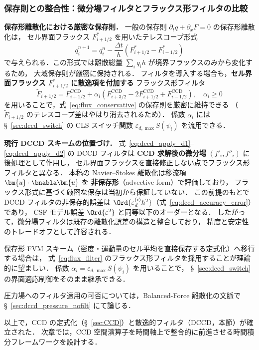 \subsubsection{保存則との整合性：微分場フィルタとフラックス形フィルタの比較}
\label{sec:dccd_conservation}

\textbf{保存形離散化における厳密な保存則．}
一般の保存則 $\partial_t q + \partial_x F = 0$ の保存形離散化は，
セル界面フラックス $F_{i+1/2}^*$ を用いたテレスコープ形式
\begin{equation}
  q_i^{n+1} = q_i^n - \frac{\Delta t}{h}\!\left(F_{i+1/2}^* - F_{i-1/2}^*\right)
  \label{eq:flux_conservative}
\end{equation}
で与えられる．この形式では離散総量 $\sum_i q_i h$ が境界フラックスのみから変化するため，
大域保存則が厳密に保持される．
フィルタを導入する場合も，\textbf{セル界面フラックス $F_{i+1/2}^*$ に散逸項を付加する}
フラックス形フィルタ
\begin{equation}
  \tilde{F}_{i+1/2} = F_{i+1/2}^{\mathrm{CCD}}
    + \alpha_i\!\left(F_{i+3/2}^{\mathrm{CCD}} - 2F_{i+1/2}^{\mathrm{CCD}} + F_{i-1/2}^{\mathrm{CCD}}\right),
  \quad \alpha_i \geq 0
  \label{eq:flux_filter}
\end{equation}
を用いることで，式~\eqref{eq:flux_conservative} の保存則を厳密に維持できる
（$\tilde{F}_{i+1/2}$ のテレスコープ差はやはり消去されるため）．
係数 $\alpha_i$ には §~\ref{sec:dccd_switch} の
CLS スイッチ関数 $\varepsilon_{d,\max} S(\psi_i)$ を流用できる．

\medskip
\noindent\textbf{現行 DCCD スキームの位置づけ．}
式~\eqref{eq:dccd_apply_d1}--\eqref{eq:dccd_apply_d2} の DCCD フィルタは
\textbf{CCD 求解後の微分場} $(f'_i, f''_i)$ に後処理として作用し，
セル界面フラックスを直接修正しない点でフラックス形フィルタと異なる．
本稿の Navier--Stokes 離散化は移流項 $\bm{u}\cdot\bnabla\bm{u}$ を
\textbf{非保存形}（advective form）で評価しており，
フラックス形式に基づく厳密な保存は当初から保証していない．
この前提のもとで DCCD フィルタの非保存的誤差は
$\Ord{\varepsilon_d^{(i)} h^2}$（式~\eqref{eq:dccd_accuracy_error}）であり，
CSF モデル誤差 $\Ord{\varepsilon^2}$ と同等以下のオーダーとなる．
したがって，微分場フィルタは既存の離散化誤差の構造と整合しており，
精度と安定性のトレードオフとして許容される．

\begin{tcolorbox}[mybox, title={フラックス形フィルタの適用指針}]
\label{result:flux_filter_guideline}
保存形 FVM スキーム（密度・運動量のセル平均を直接保存する定式化）へ移行する場合は，
式~\eqref{eq:flux_filter} のフラックス形フィルタを採用することが理論的に望ましい．
係数 $\alpha_i = \varepsilon_{d,\max} S(\psi_i)$ を用いることで，
§~\ref{sec:dccd_switch} の界面適応制御をそのまま継承できる．
\end{tcolorbox}

圧力場へのフィルタ適用の可否については，Balanced-Force 離散化の文脈で
§~\ref{sec:dccd_pressure_nofilt} にて論じる．

\bigskip\noindent
以上で，CCD の定式化（§~\ref{sec:CCD}）と散逸的フィルタ（DCCD，本節）が確立された．
次章では，CCD 空間演算子を時間軸上で整合的に前進させる時間積分フレームワークを設計する．
